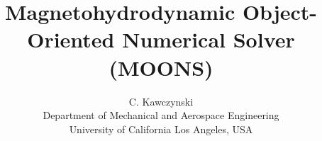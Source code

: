 \documentclass[11pt]{article}
\begin{document}
\doublespacing
\title{Magnetohydrodynamic Object-Oriented Numerical Solver (MOONS)}
\author{C. Kawczynski \\
Department of Mechanical and Aerospace Engineering \\
University of California Los Angeles, USA\\}

\end{document}
